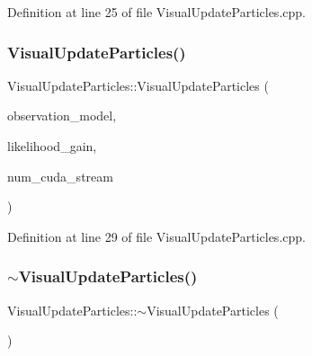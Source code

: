 Definition at line 25 of file Visual\+Update\+Particles.\+cpp.

\mbox{\label{classVisualUpdateParticles_a225e07a8873f4ed372b3b12ee4a0f044}} 
\subsubsection{\texorpdfstring{Visual\+Update\+Particles()}{VisualUpdateParticles()}\hspace{0.1cm}{\footnotesize\ttfamily [3/3]}}
{\footnotesize\ttfamily Visual\+Update\+Particles\+::\+Visual\+Update\+Particles (\begin{DoxyParamCaption}\item[{std\+::unique\+\_\+ptr$<$ \hyperlink{classVisualProprioception}{Visual\+Proprioception} $>$}]{observation\+\_\+model,  }\item[{const double}]{likelihood\+\_\+gain,  }\item[{const int}]{num\+\_\+cuda\+\_\+stream }\end{DoxyParamCaption})\hspace{0.3cm}{\ttfamily [noexcept]}}



Definition at line 29 of file Visual\+Update\+Particles.\+cpp.

\mbox{\label{classVisualUpdateParticles_a96097675396400a8f6932e4c867d9f30}} 
\subsubsection{\texorpdfstring{$\sim$\+Visual\+Update\+Particles()}{~VisualUpdateParticles()}}
{\footnotesize\ttfamily Visual\+Update\+Particles\+::$\sim$\+Visual\+Update\+Particles (\begin{DoxyParamCaption}{ }\end{DoxyParamCaption})\hspace{0.3cm}{\ttfamily [noexcept]}}



